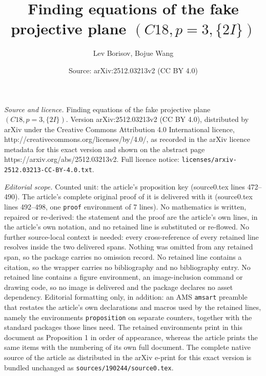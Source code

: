 \documentclass[10pt,a4paper]{amsart}
\title{Finding equations of the fake projective plane $(C18,p=3,\{2I\})$}
\author{Lev Borisov, Bojue Wang}
\date{Source: arXiv:2512.03213v2 (CC BY 4.0)}
\begin{document}
\maketitle

\noindent\emph{Source and licence.} Finding equations of the fake projective plane $(C18,p=3,\{2I\})$. Version arXiv:2512.03213v2 (CC BY 4.0), distributed by arXiv under the Creative Commons Attribution 4.0 International licence, http://creativecommons.org/licenses/by/4.0/, as recorded in the arXiv licence metadata for this exact version and shown on the abstract page https://arxiv.org/abs/2512.03213v2. Full licence notice: \texttt{licenses/arxiv-2512.03213-CC-BY-4.0.txt}.\par\smallskip

\noindent\textit{Editorial scope.} Counted unit: the article's proposition key (source0.tex lines 472--490). The article's complete original proof of it is delivered with it (source0.tex lines 492--498, one \texttt{proof} environment of 7 lines). No mathematics is written, repaired or re-derived: the statement and the proof are the article's own lines, in the article's own notation, and no retained line is substituted or re-flowed.  No further source-local context is needed: every cross-reference of every retained line resolves inside the two delivered spans.  Nothing was omitted from any retained span, so the package carries no omission record.  No retained line contains a citation, so the wrapper carries no bibliography and no bibliography entry.  No retained line contains a figure environment, an image-inclusion command or drawing code, so no image is delivered and the package declares no asset dependency.  Editorial formatting only, in addition: an AMS \texttt{amsart} preamble that restates the article's own declarations and macros used by the retained lines, namely the environments \texttt{proposition} on separate counters, together with the standard packages those lines need.  The retained environments print in this document as Proposition 1 in order of appearance, whereas the article prints the same items with the numbering of its own full document.  The complete native source of the article as distributed in the arXiv e-print for this exact version is bundled unchanged as \texttt{sources/190244/source0.tex}.
\end{document}
